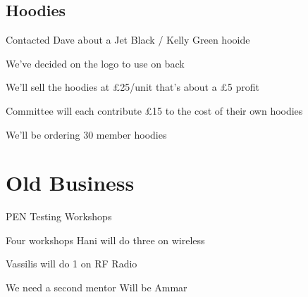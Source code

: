 \documentclass[11pt,hacksoc]{meetingmins}
\begin{document}
\subsection{Hoodies}
\begin{hiddensubitems}
	\item
	Contacted Dave about a Jet Black / Kelly Green hooide
	
	\item
	We've decided on the logo to use on back
	
	\item
	
	\item
	We'll sell the hoodies at \pounds25/unit that's about a \pounds5 profit
	
	\item
	Committee will each contribute \pounds15 to the cost of their own hoodies
	
	\item
	We'll be ordering 30 member hoodies
	
\end{hiddensubitems}

\section{Old Business}
\begin{items}
	\item
	PEN Testing Workshops
	
	\item
	Four workshops
		\subitem
		Hani will do three on wireless
		
		\subitem
		Vassilis will do 1 on RF Radio
		
	\item
	We need a second mentor
		\subitem
		Will be Ammar
	
\end{items}
\end{document}
